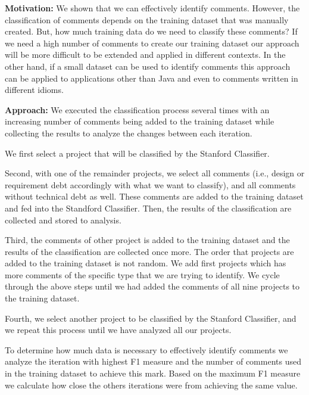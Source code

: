 \vspace{3mm}
\noindent\rqiii
\vspace{3mm}

\noindent \textbf{Motivation:} We shown that we can effectively identify \SATD comments. However, the classification of \SATD comments depends on the training dataset that was manually created. But, how much training data do we need to classify these comments? If we need a high number of comments to create our training dataset our approach will be more difficult to be extended and applied in different contexts. In the other hand, if a small dataset can be used to identify \SATD comments this approach can be applied to applications other than Java and even to comments written in different idioms. 

\vspace{1mm}
\noindent \textbf{Approach:} We executed the classification process several times with an increasing number of comments being added to the training dataset while collecting the results to analyze the changes between each iteration.

We first select a project that will be classified by the Stanford Classifier.

Second, with one of the remainder projects, we select all \SATD comments (i.e., design or requirement debt accordingly with what we want to classify), and all comments without technical debt as well. These comments are added to the training dataset and fed into the Standford Classifier. Then, the results of the classification are collected and stored to analysis.

Third, the comments of other project is added to the training dataset and the results of the classification are collected once more. The order that projects are added to the training dataset is not random. We add first projects which has more \SATD comments of the specific type that we are trying to identify. We cycle through the above steps until we had added the comments of all nine projects to the training dataset.

Fourth, we select another project to be classified by the Stanford Classifier, and we repeat this process until we have analyzed all our projects.
 
To determine how much data is necessary to effectively identify \SATD comments we analyze the iteration with highest F1 measure and the number of comments used in the training dataset to achieve this mark. Based on the maximum F1 measure we calculate how close the others iterations were from achieving the same value.

